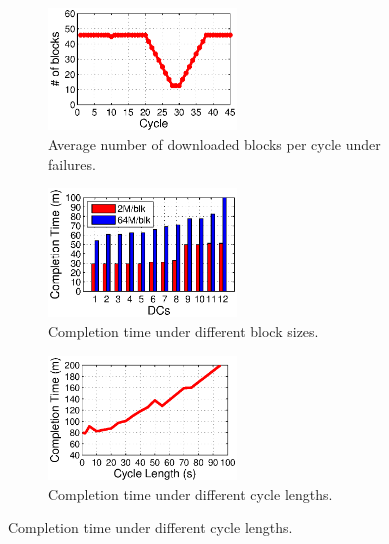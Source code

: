 \begin{figure}[t]
        \centering
        \begin{subfigure}[b]{0.3\textwidth}
                \centering
                \includegraphics[width=50mm]{images/failure.eps}%
                \caption{Average number of downloaded blocks per cycle under failures.}
                \label{fig:analysis:failure}
        \end{subfigure}
        \begin{subfigure}[b]{0.3\textwidth}
                \centering
                \includegraphics[width=50mm]{images/blkSize.eps} %
                \caption{Completion time under different block sizes.}
                \label{fig:analysis:blksize}
        \end{subfigure}
        \begin{subfigure}[b]{0.3\textwidth}
                \centering
                \includegraphics[width=50mm]{images/cycleDiff.eps}%
                \caption{Completion time under different cycle lengths.}
                \label{fig:analysis:cycleDiff}
        \end{subfigure}
        \label{fig:analysis}
\vspace{-0.4cm}
\end{figure}


